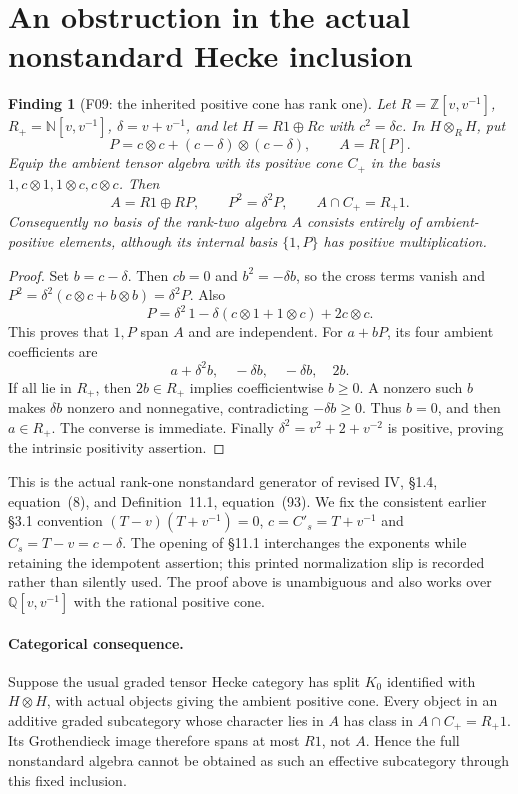 \documentclass[11pt,a4paper]{article}
\newcommand{\Q}{\mathbb Q}\newcommand{\Z}{\mathbb Z}\newcommand{\C}{\mathbb C}\newcommand{\N}{\mathbb N}\newcommand{\F}{\mathbb F}
\newcommand{\fid}[1]{\textsf{#1}}\newcommand{\gate}[1]{\textsf{#1}}
\theoremstyle{named}\newtheorem{finding}{Finding}[section]
\theoremstyle{definition}\newtheorem{definition}[finding]{Definition}
\theoremstyle{remark}\newtheorem{remark}[finding]{Remark}
\begin{document}
\section{An obstruction in the actual nonstandard Hecke inclusion}\label{sec:ambient}
\begin{finding}[\fid{F09}: the inherited positive cone has rank one]\label{f:hecke}
Let $R=\Z[v,v^{-1}]$, $R_+=\N[v,v^{-1}]$, $\delta=v+v^{-1}$, and let $H=R1\oplus Rc$ with $c^2=\delta c$. In $H\otimes_RH$, put
\[
 P=c\otimes c+(c-\delta)\otimes(c-\delta),\qquad A=R[P].
\]
Equip the ambient tensor algebra with its positive cone $C_+$ in the basis
$1,c\otimes1,1\otimes c,c\otimes c$. Then
\begin{equation}\label{eq:cone}
 A=R1\oplus RP,\qquad P^2=\delta^2P,\qquad A\cap C_+=R_+1.
\end{equation}
Consequently no basis of the rank-two algebra $A$ consists entirely of ambient-positive elements, although its internal basis $\{1,P\}$ has positive multiplication.
\end{finding}
\begin{proof}
Set $b=c-\delta$. Then $cb=0$ and $b^2=-\delta b$, so the cross terms vanish and
$P^2=\delta^2(c\otimes c+b\otimes b)=\delta^2P$. Also
\[
 P=\delta^2\,1-\delta(c\otimes1+1\otimes c)+2c\otimes c.
\]
This proves that $1,P$ span $A$ and are independent. For $a+bP$, its four ambient coefficients are
\[
 a+\delta^2b,\quad-\delta b,\quad-\delta b,\quad2b.
\]
If all lie in $R_+$, then $2b\in R_+$ implies coefficientwise $b\ge0$. A nonzero such $b$ makes $\delta b$ nonzero and nonnegative, contradicting $-\delta b\ge0$. Thus $b=0$, and then $a\in R_+$. The converse is immediate. Finally $\delta^2=v^2+2+v^{-2}$ is positive, proving the intrinsic positivity assertion.
\end{proof}
This is the actual rank-one nonstandard generator of revised IV, \S1.4, equation~(8), and Definition~11.1, equation~(93). We fix the consistent earlier \S3.1 convention
$(T-v)(T+v^{-1})=0$, $c=C'_s=T+v^{-1}$ and $C_s=T-v=c-\delta$.
The opening of \S11.1 interchanges the exponents while retaining the idempotent assertion; this printed normalization slip is recorded rather than silently used. The proof above is unambiguous and also works over $\Q[v,v^{-1}]$ with the rational positive cone.

\paragraph{Categorical consequence.}
Suppose the usual graded tensor Hecke category has split $K_0$ identified with $H\otimes H$, with actual objects giving the ambient positive cone. Every object in an additive graded subcategory whose character lies in $A$ has class in $A\cap C_+=R_+1$. Its Grothendieck image therefore spans at most $R1$, not $A$. Hence the full nonstandard algebra cannot be obtained as such an effective subcategory through this fixed inclusion.
\end{document}

